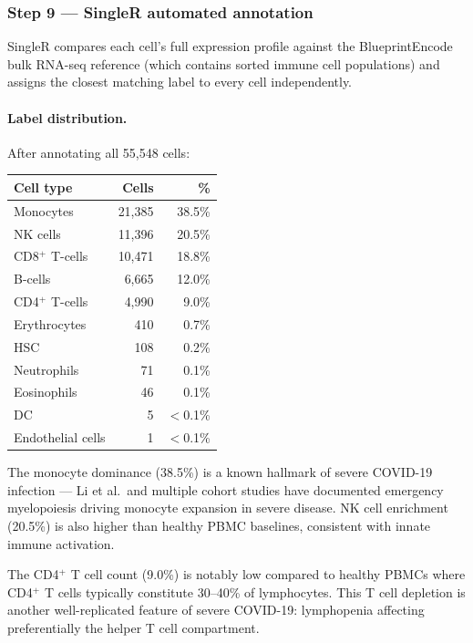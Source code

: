 \documentclass[11pt, a4paper]{article}
\begin{document}
\subsubsection*{Step 9 — SingleR automated annotation}

SingleR compares each cell's full expression profile against the
BlueprintEncode bulk RNA-seq reference (which contains sorted immune cell
populations) and assigns the closest matching label to every cell independently.

\paragraph*{Label distribution.}
After annotating all 55,548 cells:

\begin{center}
\begin{tabular}{lrr}
\hline
\textbf{Cell type} & \textbf{Cells} & \textbf{\%} \\
\hline
Monocytes        & 21,385 & 38.5\% \\
NK cells         & 11,396 & 20.5\% \\
CD8$^+$ T-cells  & 10,471 & 18.8\% \\
B-cells          &  6,665 & 12.0\% \\
CD4$^+$ T-cells  &  4,990 &  9.0\% \\
Erythrocytes     &    410 &  0.7\% \\
HSC              &    108 &  0.2\% \\
Neutrophils      &     71 &  0.1\% \\
Eosinophils      &     46 &  0.1\% \\
DC               &      5 & $<$0.1\% \\
Endothelial cells &     1 & $<$0.1\% \\
\hline
\end{tabular}
\end{center}

The monocyte dominance (38.5\%) is a known hallmark of severe COVID-19 infection —
Li et al.\ and multiple cohort studies have documented emergency myelopoiesis driving
monocyte expansion in severe disease. NK cell enrichment (20.5\%) is also higher than
healthy PBMC baselines, consistent with innate immune activation.

The CD4$^+$ T cell count (9.0\%) is notably low compared to healthy PBMCs where
CD4$^+$ T cells typically constitute 30--40\% of lymphocytes. This T cell depletion
is another well-replicated feature of severe COVID-19: lymphopenia affecting preferentially
the helper T cell compartment.
\end{document}
